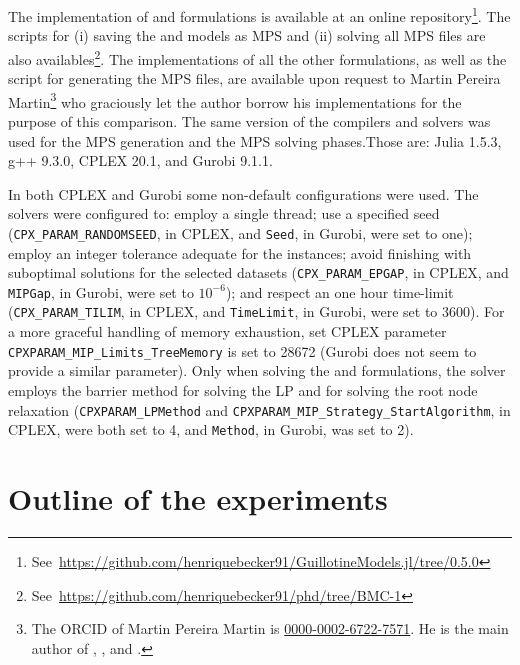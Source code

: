 The implementation of {\modelBecker} and {\modelFMT} formulations is available at an online repository\footnote{See~\url{https://github.com/henriquebecker91/GuillotineModels.jl/tree/0.5.0}}.
The scripts for (i) saving the {\modelBecker} and {\modelFMT} models as MPS and (ii) solving all MPS files are also availables\footnote{See~\url{https://github.com/henriquebecker91/phd/tree/BMC-1}}.
The implementations of all the other formulations, as well as the script for generating the MPS files, are available upon request to Martin Pereira Martin\footnote{The ORCID of Martin Pereira Martin is \href{https://orcid.org/0000-0002-6722-7571}{0000-0002-6722-7571}.
He is the main author of \citet{martin:2020}, \citet{martin:2020:bottom}, and \citet{martin:2020:top}.} who graciously let the author borrow his implementations for the purpose of this comparison. %
The same version of the compilers and solvers was used for the MPS generation and the MPS solving phases.Those are: Julia 1.5.3, g++ 9.3.0, CPLEX 20.1, and Gurobi 9.1.1.

In both CPLEX and Gurobi some non-default configurations were used.
The solvers were configured to:
employ a single thread;
use a specified seed (\texttt{CPX_PARAM_RANDOMSEED}, in CPLEX, and \texttt{Seed}, in Gurobi, were set to one);
employ an integer tolerance adequate for the instances; avoid finishing with suboptimal solutions for the selected datasets (\texttt{CPX_PARAM_EPGAP}, in CPLEX, and \texttt{MIPGap}, in Gurobi, were set to \(10^{-6}\));
and respect an one hour time-limit (\texttt{CPX_PARAM_TILIM}, in CPLEX, and \texttt{TimeLimit}, in Gurobi, were set to 3600). For a more graceful handling of memory exhaustion, set CPLEX parameter \texttt{CPXPARAM_MIP_Limits_TreeMemory} is set to 28672 (Gurobi does not seem to provide a similar parameter).
Only when solving the {\modelFMT} and {\modelBecker} formulations, the solver employs the barrier method for solving the LP and for solving the root node relaxation (\texttt{CPXPARAM_LPMethod} and \texttt{CPXPARAM_MIP_Strategy_StartAlgorithm}, in CPLEX, were both set to 4, and \texttt{Method}, in Gurobi, was set to 2).

\section{Outline of the experiments}
\label{sec:outine_experiments_other_formulations}

